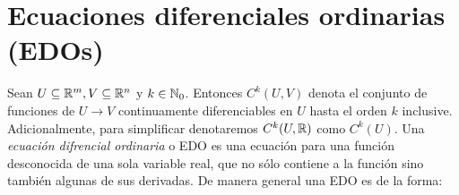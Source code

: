 %	
%	

\section{Ecuaciones diferenciales ordinarias (EDOs)}

Sean $U \subseteq {\mathbb{R}}^{m}, V \subseteq {\mathbb{R}}^{n}$ y $k\in {\mathbb{N}}_{0}$. Entonces $C^{k}(U, V)$ denota el conjunto de funciones de $U \longrightarrow V$ continuamente diferenciables en $U$ hasta el orden $k$ inclusive. Adicionalmente, para simplificar denotaremos $C^{k}(U, {\mathbb{R}})$ como $C^{k}(U)$. Una \textit{ecuación difrencial ordinaria} o EDO \cite[p. 6]{teschl2012} es una ecuación para una función desconocida de una sola variable real, que no sólo contiene a la función sino también algunas de sus derivadas. De manera general una EDO es de la forma:

